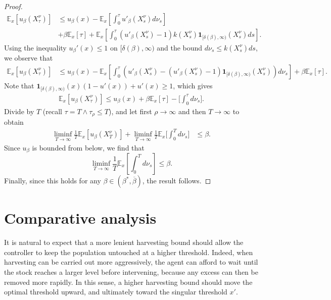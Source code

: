 \documentclass[12pt]{article}
\begin{document}
\begin{proof}
\begin{align*}
    \mathbb{E}_x[ u_\beta(X^\nu_{\tau}) ]
    & \leq u_\beta(x) - \mathbb{E}_x \left[\int_0^{\tau}u'_\beta(X_s^\nu) d\nu_s \right] \\
    & + \beta \mathbb{E}_x [\tau] 
    + \mathbb{E}_x \left[ \int_0^{\tau}  (u'_{\beta}(X_s^\nu)-1)k(X_s^\nu) \mathbf{1}_{[\delta(\beta),\infty)}(X_s^\nu) ds \right].
\end{align*}
Using the inequality $u_{\beta}'(x) \leq 1$ on $[\delta(\beta), \infty)$ and the bound $d\nu_s\leq k(X_s^\nu) ds$, we observe that
\begin{align*}
    \mathbb{E}_x[ u_\beta(X^\nu_{\tau}) ]
    & \leq u_\beta(x) - \mathbb{E}_x \left[\int_0^{\tau} (u'_\beta(X_s^\nu) - (u'_{\beta}(X_s^\nu)-1)
    \mathbf{1}_{[\delta(\beta),\infty)}(X_s^\nu)
   )d\nu_s \right]
    + \beta \mathbb{E}_x [\tau]. 
\end{align*}
Note that $\mathbf{1}_{[\delta(\beta),\infty)}(x)(1-u'(x)) + u'(x) \geq 1$, which gives
\begin{align*}
    \mathbb{E}_x[ u_\beta(X^\nu_{\tau}) ]
    \leq u_\beta(x)+ \beta \mathbb{E}_x [\tau] - \bigg[\int_0^{\tau}  d \nu_s \bigg]. 
\end{align*}
Divide by $T$ (recall $\tau=T\wedge\tau_\rho\le T$), and let first $\rho\to\infty$ and then $T\to\infty$ to obtain
\begin{align*}  
    \liminf_{T \to \infty}\frac{1}{T}\mathbb{E}_x[u_{\beta}(X_{T}^{\nu})] +  \liminf_{T \to \infty}\frac{1}{T}\mathbb{E}_x \bigg[\int_0^{T}  d \nu_s \bigg] & \leq  \beta . 
\end{align*}
Since $u_{\beta}$ is bounded from below, we find that
\begin{equation*}
    \liminf_{T \to \infty} \frac{1}{T} \mathbb{E}_x \left[\int_0^T d\nu_s \right] \leq \beta.
\end{equation*}
Finally, since this holds for any $\beta \in (\beta^*,\overline\beta)$,
the result follows.
\end{proof}


\section{Comparative analysis}\label{Sec:Comparative}

It is natural to expect that a more lenient harvesting bound should allow the controller to keep the population untouched at a higher threshold. Indeed, when harvesting can be carried out more aggressively, the agent can afford to wait until the stock reaches a larger level before intervening, because any excess can then be removed more rapidly. In this sense, a higher harvesting bound should move the optimal threshold upward, and ultimately toward the singular threshold $x'$.
\end{document}
